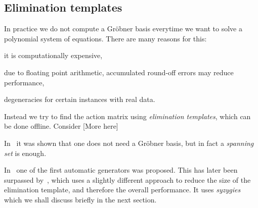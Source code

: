 \documentclass[11pt,a4paper]{article}
\theoremstyle{definition}
\begin{document}
\subsection{Elimination templates}
In practice we do not compute a Gröbner basis everytime we want to solve a polynomial system
of equations. There are many reasons for this:
\begin{enumerate*}[label={(\roman*)}]
\item it is computationally expensive,
\item due to floating point arithmetic, accumulated round-off errors may reduce performance,
\item degeneracies for certain instances with real data.
\end{enumerate*}
Instead we try to find the action matrix using \emph{elimination templates}, which can
be done offline. Consider 
{\color{red}[More here]}

In~\cite{byrod-phd} it was shown that one does not need a Gröbner basis, but in fact
a \emph{spanning set} is enough.

In~\cite{kukelova2008} one of the first automatic generators was proposed.
This has later been surpassed by~\cite{larsson2017cvpr}, which uses a slightly
different approach to reduce the size of the elimination template, and therefore the overall
performance. It uses \emph{syzygies} which we shall discuss briefly in the next section.
\end{document}
